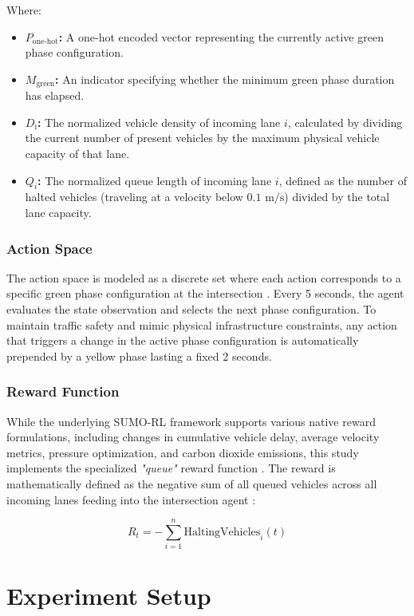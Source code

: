 \documentclass[conference]{IEEEtran}
\begin{document}
Where:
\begin{itemize}
    \item \textbf{$P_{\text{one-hot}}$:} A one-hot encoded vector representing the currently active green phase configuration.
    \item \textbf{$M_{\text{green}}$:} An indicator specifying whether the minimum green phase duration has elapsed.
    \item \textbf{$D_{\text{i}}$:} The normalized vehicle density of incoming lane $i$, calculated by dividing the current number of present vehicles by the maximum physical vehicle capacity of that lane.
    \item \textbf{$Q_i$:} The normalized queue length of incoming lane $i$, defined as the number of halted vehicles (traveling at a velocity below $0.1 \text{ m/s}$) divided by the total lane capacity.
\end{itemize}

\subsubsection{Action Space}
The action space is modeled as a discrete set where each action corresponds to a specific green phase configuration at the intersection \cite{actions}. Every 5 seconds, the agent evaluates the state observation and selects the next phase configuration. To maintain traffic safety and mimic physical infrastructure constraints, any action that triggers a change in the active phase configuration is automatically prepended by a yellow phase lasting a fixed 2 seconds.

\subsubsection{Reward Function}
While the underlying SUMO-RL framework supports various native reward formulations, including changes in cumulative vehicle delay, average velocity metrics, pressure optimization, and carbon dioxide emissions, this study implements the specialized \textit{"queue"} reward function \cite{reward-list}. The reward is mathematically defined as the negative sum of all queued vehicles across all incoming lanes feeding into the intersection agent \cite{q-reward}:

\begin{equation}
    R_t = - \sum_{i=1}^{n} \text{HaltingVehicles}_i(t)
\end{equation}

\section{Experiment Setup}
\end{document}
